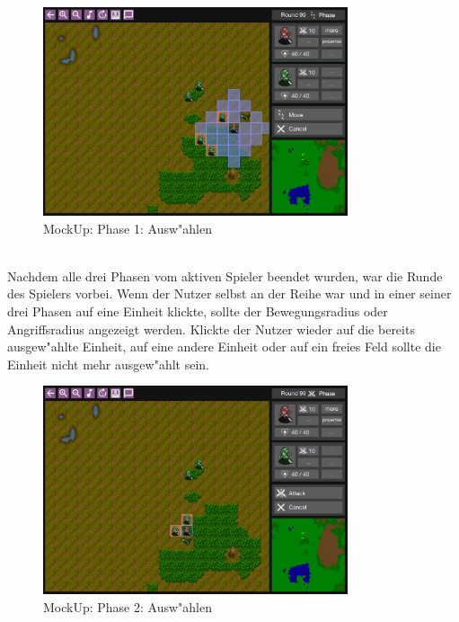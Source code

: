 \documentclass[12pt, titlepage]{scrartcl}
\begin{document}
			        \begin{figure}[H] 
    				    \centering
    				    \includegraphics[width=0.8\textwidth]{images/mockUps/Select.png}
    				    \caption{MockUp: Phase 1: Ausw"ahlen}
    				    \label{Select_1}
			        \end{figure}
			        \ \\ Nachdem alle drei Phasen vom aktiven Spieler beendet wurden, war die Runde des Spielers vorbei. Wenn der Nutzer selbst an der Reihe war und in einer seiner drei Phasen auf eine Einheit klickte, sollte der Bewegungsradius oder Angriffsradius angezeigt werden. Klickte der Nutzer wieder auf die bereits ausgew"ahlte Einheit, auf eine andere Einheit oder auf ein freies Feld sollte die Einheit nicht mehr ausgew"ahlt sein. \\
                    \begin{figure}[H] 
    				    \centering
    				    \includegraphics[width=0.8\textwidth]{images/mockUps/Select3.png}
    				    \caption{MockUp: Phase 2: Ausw"ahlen}
    				    \label{Select_2}
			        \end{figure} 
\end{document}
